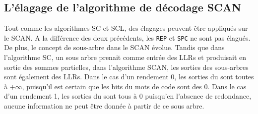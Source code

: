 \subsection{L'élagage de l'algorithme de décodage SCAN}
Tout comme les algorithmes SC et SCL, des élagages peuvent être appliqués sur le SCAN. A la différence des deux précédents, les \noeuds \texttt{REP} et \texttt{SPC} ne sont pas élagués. De plus, le concept de sous-arbre dans le SCAN évolue. Tandis que dans l'algorithme SC, un sous arbre prenait comme entrée des LLRs et produisait en sortie des sommes partielles, dans l'algorithme SCAN, les sorties des sous-arbres sont également des LLRs. Dans le cas d'un rendement 0, les sorties du \noeud sont toutes à $+\infty$, puisqu'il est certain que les bits du mots de code sont des $0$. Dans le cas d'un rendement 1, les sorties du \noeud sont tous à $0$ puisqu'en l'absence de redondance, aucune information ne peut être donnée à partir de ce sous arbre.



